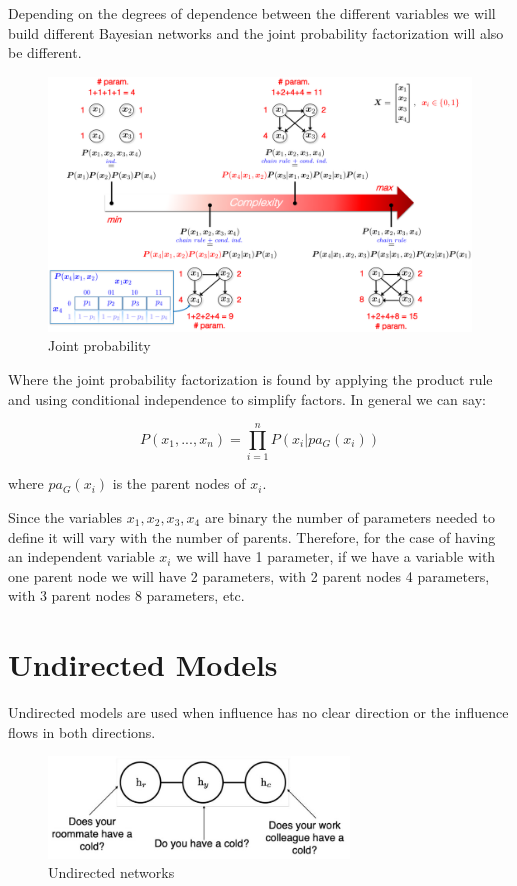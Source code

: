 \newpage

\noindent Depending on the degrees of dependence between the different variables we will build different Bayesian networks and the joint probability factorization will also be different.

\begin{figure}[h]
    \centering
    \includegraphics[width=15cm]{Images/joint-probability.png}
    \caption{Joint probability}
    \label{fig:joint-probability}
\end{figure}

\noindent Where the joint probability factorization is found by applying the product rule and using conditional independence to simplify factors. In general we can say:

$$ P(x_1, ..., x_n) = \prod_{i=1}^n P(x_i | pa_G (x_i)) $$

where $pa_G(x_i)$ is the parent nodes of $x_i$.

\noindent Since the variables $x_1, x_2, x_3, x_4$ are binary the number of parameters needed to define it will vary with the number of parents. Therefore, for the case of having an independent variable $x_i$ we will have 1 parameter, if we have a variable with one parent node we will have 2 parameters, with 2 parent nodes 4 parameters, with 3 parent nodes 8 parameters, etc. 



\section{Undirected Models}

Undirected models are used when influence has no clear direction or the influence flows in both directions.

\begin{figure}[h]
    \centering
    \includegraphics[width=8cm]{Images/undirected-network.jpg}
    \caption{Undirected networks}
    \label{fig:undirected-networks}
\end{figure}

